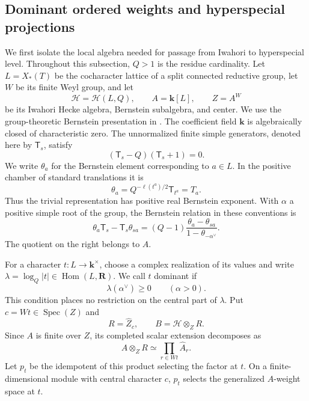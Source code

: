 \subsection{Dominant ordered weights and hyperspecial projections}

We first isolate the local algebra needed for passage from Iwahori to
hyperspecial level.  Throughout this subsection, $Q>1$ is the residue
cardinality.  Let $L=X_*(T)$ be the cocharacter lattice of a split connected
reductive group, let $W$ be its finite Weyl group, and let
\[
  \mathcal H=\mathcal H(L,Q),\qquad
  A=\mathbf k[L],\qquad Z=A^W
\]
be its Iwahori Hecke algebra, Bernstein subalgebra, and center.
We use the group-theoretic Bernstein presentation in
\cite[Lemmas~1.6.1 and~1.7.1, Remark~1.7.2, and
Equation~(1.15.2)]{HainesKottwitzPrasad}.
The coefficient field $\mathbf k$ is algebraically closed of characteristic
zero.  The unnormalized finite simple generators, denoted here by
$\mathsf T_s$, satisfy
\[
  (\mathsf T_s-Q)(\mathsf T_s+1)=0.
\]
We write $\theta_a$ for the Bernstein element corresponding to $a\in L$.
In the positive chamber of standard translations it is
\[
  \theta_a=Q^{-\ell(t^a)/2}\mathsf T_{t^a}=T_a.
\]
Thus the trivial representation has positive real Bernstein exponent.
With $\alpha$ a positive simple root of the group, the Bernstein relation
in these conventions is
\begin{equation}\label{ext:bernstein-relation}
 \theta_a\mathsf T_s-\mathsf T_s\theta_{sa}
  =(Q-1)\frac{\theta_a-\theta_{sa}}{1-\theta_{-\alpha^\vee}}.
\end{equation}
The quotient on the right belongs to $A$.

For a character $t\colon L\to\mathbf k^\times$, choose a complex
realization of its values and write
$\lambda=\log_Q|t|\in\operatorname{Hom}(L,\mathbf R)$.
We call $t$ dominant if
\begin{equation}\label{ext:dominant-character}
  \lambda(\alpha^\vee)\ge0\qquad(\alpha>0).
\end{equation}
This condition places no restriction on the central part of $\lambda$.
Put $c=Wt\in\operatorname{Spec}(Z)$ and
\[
  R=\widehat{Z}_{c},\qquad B=\mathcal H\otimes_Z R.
\]
Since $A$ is finite over $Z$, its completed scalar extension decomposes as
\[
  A\otimes_Z R\simeq\prod_{r\in Wt}\widehat A_r.
\]
Let $p_t$ be the idempotent of this product selecting the factor at $t$.
On a finite-dimensional module with central character $c$, $p_t$ selects
the generalized $A$-weight space at $t$.

